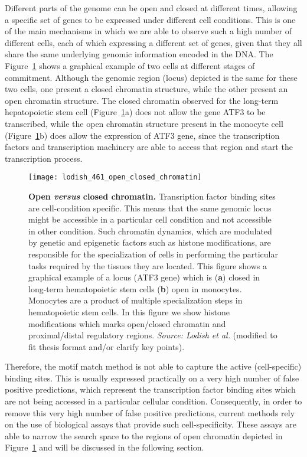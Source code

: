 Different parts of the genome can be open and closed at different times, allowing a specific set of genes to be expressed under different cell conditions. This is one of the main mechanisms in which we are able to observe such a high number of different cells, each of which expressing a different set of genes, given that they all share the same underlying genomic information encoded in the DNA. The Figure~\ref{fig:lodish_open_closed_chromatin} shows a graphical example of two cells at different stages of commitment. Although the genomic region (locus) depicted is the same for these two cells, one present a closed chromatin structure, while the other present an open chromatin structure. The closed chromatin observed for the long-term hepatopoietic stem cell (Figure~\ref{fig:lodish_open_closed_chromatin}a) does not allow the gene ATF3 to be transcribed, while the open chromatin structure present in the monocyte cell (Figure~\ref{fig:lodish_open_closed_chromatin}b) does allow the expression of ATF3 gene, since the transcription factors and transcription machinery are able to access that region and start the transcription process.

\begin{figure}[h!]
\centering
\texttt{[image: lodish\_461\_open\_closed\_chromatin]}
\caption[Open \emph{versus} closed chromatin]{\textbf{Open \emph{versus} closed chromatin.} Transription factor binding sites are cell-condition specific. This means that the same genomic locus might be accessible in a particular cell condition and not accessible in other condition. Such chromatin dynamics, which are modulated by genetic and epigenetic factors such as histone modifications, are responsible for the specialization of cells in performing the particular tasks required by the tissues they are located. This figure shows a graphical example of a locus (ATF3 gene) which is (\textbf{a}) closed in long-term hematopoietic stem cells (\textbf{b}) open in monocytes. Monocytes are a product of multiple specialization steps in hematopoietic stem cells. In this figure we show histone modifications which marks open/closed chromatin and proximal/distal regulatory regions. \emph{Source: Lodish et al.}\cite{lodish2007} (modified to fit thesis format and/or clarify key points).}
\label{fig:lodish_open_closed_chromatin}
\end{figure}

Therefore, the motif match method is not able to capture the active (cell-specific) binding sites. This is usually expressed practically on a very high number of false positive predictions, which represent the transcription factor binding sites which are not being accessed in a particular cellular condition. Consequently, in order to remove this very high number of false positive predictions, current methods rely on the use of biological assays that provide such cell-specificity. These assays are able to narrow the search space to the regions of open chromatin depicted in Figure~\ref{fig:lodish_open_closed_chromatin} and will be discussed in the following section.

